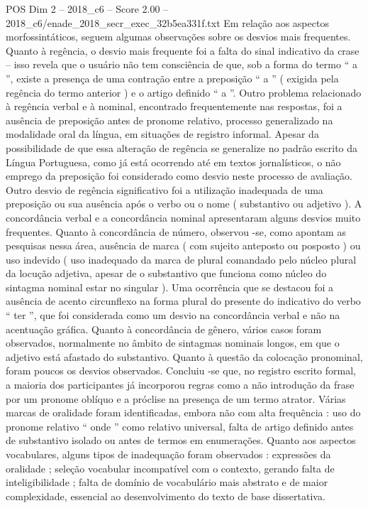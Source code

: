 \begin{textsample}{POS Dim 2 – 2018\_c6 – Score 2.00 – 2018\_c6/enade\_2018\_secr\_exec\_32b5ea331f.txt}
Em relação aos aspectos morfossintáticos, seguem algumas observações sobre os desvios mais frequentes.
Quanto à regência, o desvio mais frequente foi a falta do sinal indicativo da crase – isso revela que o usuário não tem consciência de que, sob a forma do termo “ a ”, existe a presença de uma contração entre a preposição “ a ” ( exigida pela regência do termo anterior ) e o artigo definido “ a ”.
Outro problema relacionado à regência verbal e à nominal, encontrado frequentemente nas respostas, foi a ausência de preposição antes de pronome relativo, processo generalizado na modalidade oral da língua, em situações de registro informal.
Apesar da possibilidade de que essa alteração de regência se generalize no padrão escrito da Língua Portuguesa, como já está ocorrendo até em textos jornalísticos, o não emprego da preposição foi considerado como desvio neste processo de avaliação.
Outro desvio de regência significativo foi a utilização inadequada de uma preposição ou sua ausência após o verbo ou o nome ( substantivo ou adjetivo ).
A concordância verbal e a concordância nominal apresentaram alguns desvios muito frequentes.
Quanto à concordância de número, observou -se, como apontam as pesquisas nessa área, ausência de marca ( com sujeito anteposto ou posposto ) ou uso indevido ( uso inadequado da marca de plural comandado pelo núcleo plural da locução adjetiva, apesar de o substantivo que funciona como núcleo do sintagma nominal estar no singular ).
Uma ocorrência que se destacou foi a ausência de acento circunflexo na forma plural do presente do indicativo do verbo “ ter ”, que foi considerada como um desvio na concordância verbal e não na acentuação gráfica.
Quanto à concordância de gênero, vários casos foram observados, normalmente no âmbito de sintagmas nominais longos, em que o adjetivo está afastado do substantivo.
Quanto à questão da colocação pronominal, foram poucos os desvios observados.
Concluiu -se que, no registro escrito formal, a maioria dos participantes já incorporou regras como a não introdução da frase por um pronome oblíquo e a próclise na presença de um termo atrator.
Várias marcas de oralidade foram identificadas, embora não com alta frequência : uso do pronome relativo “ onde ” como relativo universal, falta de artigo definido antes de substantivo isolado ou antes de termos em enumerações.
Quanto aos aspectos vocabulares, alguns tipos de inadequação foram observados : expressões da oralidade ; seleção vocabular incompatível com o contexto, gerando falta de inteligibilidade ; falta de domínio de vocabulário mais abstrato e de maior complexidade, essencial ao desenvolvimento do texto de base dissertativa.

\end{textsample}
